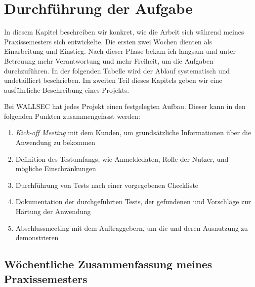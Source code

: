 \section{Durchführung der Aufgabe}

In diesem Kapitel beschreiben wir konkret, wie die Arbeit sich während meines Praxissemesters sich entwickelte. Die ersten zwei Wochen dienten als Einarbeitung und Einstieg. Nach dieser Phase bekam ich langsam und unter Betreuung mehr Verantwortung und mehr Freiheit, um die Aufgaben durchzuführen. In der folgenden Tabelle wird der Ablauf systematisch und undetailliert beschrieben. Im zweiten Teil dieses Kapitels geben wir eine ausführliche Beschreibung eines Projekts.

Bei WALLSEC hat jedes Projekt  einen festgelegten Aufbau. Dieser kann in den folgenden Punkten zusammengefasst werden:

\begin{enumerate} \label{Projektablauf}
    \item \textit{Kick-off Meeting} mit dem Kunden, um grundsätzliche Informationen über die Anwendung zu bekommen
    \item Definition des Testumfangs, wie Anmeldedaten, Rolle der Nutzer,  und mögliche Einschränkungen
    \item Durchführung von Tests nach einer vorgegebenen Checkliste
    \item Dokumentation der durchgeführten Tests, der gefundenen  und Vorschläge zur Härtung der Anwendung
    \item Abschlussmeeting mit dem Auftraggebern, um die  und deren Ausnutzung zu demonstrieren
\end{enumerate} 

\subsection{Wöchentliche Zusammenfassung meines Praxissemesters}

